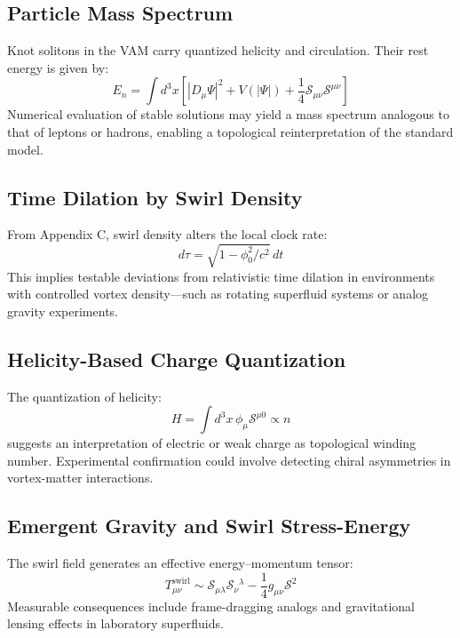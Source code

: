 \documentclass[a4paper,12pt]{article}
\begin{document}
        \subsection{Particle Mass Spectrum}
        Knot solitons in the VAM carry quantized helicity and circulation. Their rest energy is given by:
        \begin{equation}
            E_n = \int d^3x \left[ |D_\mu \Psi|^2 + V(|\Psi|) + \frac{1}{4} \mathcal{S}_{\mu\nu} \mathcal{S}^{\mu\nu} \right]
        \end{equation}
        Numerical evaluation of stable solutions may yield a mass spectrum analogous to that of leptons or hadrons, enabling a topological reinterpretation of the standard model.

        \subsection{Time Dilation by Swirl Density}
        From Appendix C, swirl density alters the local clock rate:
        \begin{equation}
            d\tau = \sqrt{1 - \phi_0^2 / c^2} \, dt
        \end{equation}
        This implies testable deviations from relativistic time dilation in environments with controlled vortex density—such as rotating superfluid systems or analog gravity experiments.

        \subsection{Helicity-Based Charge Quantization}
        The quantization of helicity:
        \begin{equation}
            H = \int d^3x \, \phi_\mu \mathcal{S}^{\mu0} \propto n
        \end{equation}
        suggests an interpretation of electric or weak charge as topological winding number. Experimental confirmation could involve detecting chiral asymmetries in vortex-matter interactions.

        \subsection{Emergent Gravity and Swirl Stress-Energy}
        The swirl field generates an effective energy--momentum tensor:
        \begin{equation}
            T_{\mu\nu}^{\text{swirl}} \sim \mathcal{S}_{\mu\lambda} \mathcal{S}_\nu{}^\lambda - \frac{1}{4} g_{\mu\nu} \mathcal{S}^2
        \end{equation}
        Measurable consequences include frame-dragging analogs and gravitational lensing effects in laboratory superfluids.
\end{document}
